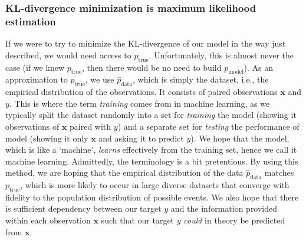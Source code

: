 \documentclass{article}
\begin{document}
\subsubsection*{KL-divergence minimization is maximum likelihood estimation}
If we were to try to minimize the KL-divergence of our model in the way just described, we would need access to $p_{\mathrm{true}}$. Unfortunately, this is almost never the case (if we knew $p_{\mathrm{true}}$, then there would be no need to build $p_{\mathrm{model}}$). As an approximation to $p_{\mathrm{true}}$, we use $\hat{p}_{\mathrm{data}}$, which is simply the dataset, i.e., the empirical distribution of the observations. It consists of paired observations $\textbf{x}$ and $y$. This is where the term \emph{training} comes from in machine learning, as we typically split the dataset randomly into a set for \emph{training} the model (showing it observations of $\textbf{x}$ paired with $y$) and a separate set for \emph{testing} the performance of model (showing it only $\textbf{x}$ and asking it to predict $y$). We hope that the model, which is like a `machine', \emph{learns} effectively from the training set, hence we call it machine learning. Admittedly, the terminology is a bit pretentious. By using this method, we are hoping that the empirical distribution of the data $\hat{p}_{\mathrm{data}}$ matches $p_{\mathrm{true}}$, which is more likely to occur in large diverse datasets that converge with fidelity to the population distribution of possible events. We also hope that there is sufficient dependency between our target $y$ and the information provided within each observation $\textbf{x}$ such that our target $y$ \emph{could} in theory be predicted from $\textbf{x}$.
\end{document}
